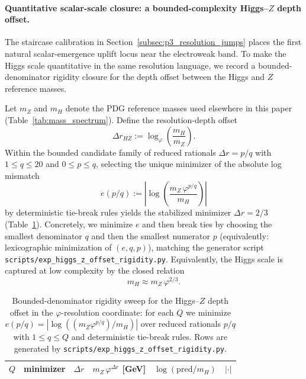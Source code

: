 \paragraph{Quantitative scalar-scale closure: a bounded-complexity Higgs--\texorpdfstring{$Z$}{Z} depth offset.}
The staircase calibration in Section~\ref{subsec:p3_resolution_jumps} places the first natural scalar-emergence uplift locus near the electroweak band.
To make the Higgs scale quantitative in the same resolution language, we record a bounded-denominator rigidity closure for the depth offset between the Higgs and $Z$ reference masses.

\begin{proposition}\label{prop:higgs_z_offset_rigidity}
Let $m_Z$ and $m_H$ denote the PDG reference masses used elsewhere in this paper (Table~\ref{tab:mass_spectrum}).
Define the resolution-depth offset
\[
\Delta r_{HZ}:=\log_\varphi\!\left(\frac{m_H}{m_Z}\right).
\]
Within the bounded candidate family of reduced rationals $\Delta r=p/q$ with $1\le q\le 20$ and $0\le p\le q$, selecting the unique minimizer of the absolute log mismatch
\[
e(p/q):=\left|\log\!\left(\frac{m_Z\,\varphi^{p/q}}{m_H}\right)\right|
\]
by deterministic tie-break rules yields the stabilized minimizer $\Delta r=2/3$ (Table~\ref{tab:higgs_z_offset_sweep}).
Concretely, we minimize $e$ and then break ties by choosing the smallest denominator $q$ and then the smallest numerator $p$ (equivalently: lexicographic minimization of $(e,q,p)$), matching the generator script \texttt{scripts/exp\_higgs\_z\_offset\_rigidity.py}.
Equivalently, the Higgs scale is captured at low complexity by the closed relation
\[
m_H\approx m_Z\,\varphi^{2/3}.
\]
\end{proposition}

\begin{table}[t]
\centering
\scriptsize
\setlength{\tabcolsep}{6pt}
\renewcommand{\arraystretch}{1.15}
\begin{tabular}{r l r r r r}
\toprule
$Q$ & minimizer & $\Delta r$ & $m_Z\,\varphi^{\Delta r}$ [GeV] & $\log(\mathrm{pred}/m_H)$ & $|\cdot|$ \\
\midrule
%
\end{tabular}
\caption{Bounded-denominator rigidity sweep for the Higgs--$Z$ depth offset in the $\varphi$-resolution coordinate: for each $Q$ we minimize $e(p/q)=|\log((m_Z\varphi^{p/q})/m_H)|$ over reduced rationals $p/q$ with $1\le q\le Q$ and deterministic tie-break rules. Rows are generated by \texttt{scripts/exp\_higgs\_z\_offset\_rigidity.py}.}
\label{tab:higgs_z_offset_sweep}
\end{table}


